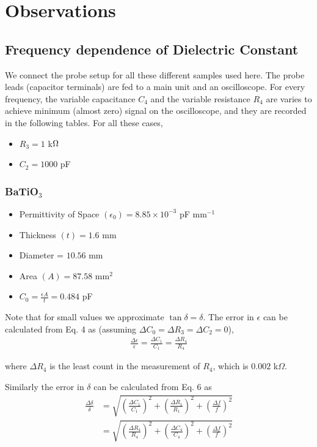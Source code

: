 \section{Observations}
	\subsection{Frequency dependence of Dielectric Constant}
	We connect the probe setup for all these different samples used here. The probe leads (capacitor terminals) are fed to a main unit and an oscilloscope. For every frequency, the variable capacitance $C_4$ and the variable resistance $R_4$ are varies to achieve minimum (almost zero) signal on the oscilloscope, and they are recorded in the following tables. 
	For all these cases,
	\begin{itemize}
		\item $R_3 = 1$ k$\ohm$
		\item $C_2 = 1000$ pF
	\end{itemize}

	\subsubsection{BaTiO$_3$}

		\begin{itemize}
			\item Permittivity of Space $(\epsilon_0) = 8.85\times10^{-3}$ pF mm$^{-1}$
			\item Thickness $(t) = 1.6$ mm
			\item Diameter = $10.56$ mm
			\item Area $(A) = 87.58$ mm$^2$
			\item $C_0 =\frac{\epsilon A}{t} = 0.484$ pF
		\end{itemize}

		

		Note that for small values we approximate $\tan \delta = \delta$. The error in $\epsilon$ can be calculated from Eq. 4 as (assuming $\Delta C_0 = \Delta R_3 = \Delta C_2 = 0$),
		\begin{align}
			\frac{\Delta \epsilon}{\epsilon} = \frac{\Delta C_1}{ C_1} = \frac{\Delta R_4}{ R_4}
		\end{align}

		where $\Delta R_4$ is the least count in the measurement of $R_4$, which is $0.002$ k$\Omega$.

		Similarly the error in $\delta$ can be calculated from Eq. 6 as
		\begin{align}
			\frac{\Delta \delta}{\delta} &= \sqrt{\left(\frac{\Delta C_1}{C_1}\right)^2 + \left(\frac{\Delta R_1}{R_1}\right)^2 + \left(\frac{\Delta f}{f}\right)^2}\\
			&= \sqrt{\left(\frac{\Delta R_4}{R_4}\right)^2 + \left(\frac{\Delta C_4}{C_4}\right)^2 + \left(\frac{\Delta f}{f}\right)^2}
		\end{align}

